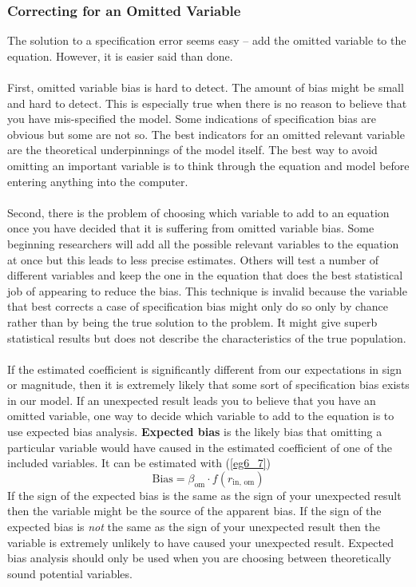 \documentclass[11pt]{article}
\begin{document}
\subsubsection{Correcting for an Omitted Variable}
The solution to a specification error seems easy -- add the omitted variable to the equation. However, it is easier said than done. \\ \\
First, omitted variable bias is hard to detect. The amount of bias might be small and hard to detect. This is especially true when there is no reason to believe that you have mis-specified the model. Some indications of specification bias are obvious but some are not so. The best indicators for an omitted relevant variable are the theoretical underpinnings of the model itself. The best way to avoid omitting an important variable is to think through the equation and model before entering anything into the computer. \\ \\
Second, there is the problem of choosing which variable to add to an equation once you have decided that it is suffering from omitted variable bias. Some beginning researchers will add all the possible relevant variables to the equation at once but this leads to less precise estimates. Others will test a number of different variables and keep the one in the equation that does the best statistical job of appearing to reduce the bias. This technique is invalid because the variable that best corrects a case of specification bias might only do so only by chance rather than by being the true solution to the problem. It might give superb statistical results but does not describe the characteristics of the true population.\\ \\
If the estimated coefficient is significantly different from our expectations in sign or magnitude, then it is extremely likely that some sort of specification bias exists in our model. If an unexpected result leads you to believe that you have an omitted variable, one way to decide which variable to add to the equation is to use expected bias analysis. \textbf{Expected bias} is the likely bias that omitting a particular variable would have caused in the estimated coefficient of one of the included variables. It can be estimated with (\ref{eg6_7})
\begin{equation*}
\text{Bias} = \beta_{\text{om}} \cdot f(r_{\text{in, om}}) 
\end{equation*}
If the sign of the expected bias is the same as the sign of your unexpected result then the variable might be the source of the apparent bias. If the sign of the expected bias is \textit{not} the same as the sign of your unexpected result then the variable is extremely unlikely to have caused your unexpected result. Expected bias analysis should only be used when you are choosing between theoretically sound potential variables. \\ \\
\end{document}
